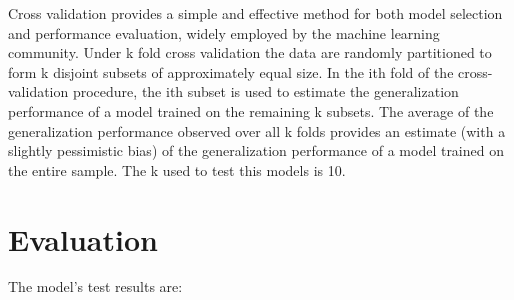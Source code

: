 Cross \textendash validation \cite{CrossValidatory} provides a simple and effective method for both model selection and performance evaluation, widely employed by the machine learning community. Under k \textendash fold cross \textendash validation the data are randomly partitioned to form k disjoint subsets of approximately equal size. In the ith fold of the cross-validation procedure, the ith subset is used to estimate the generalization performance of a model trained on the remaining k  subsets. The average of the generalization performance observed over all k folds provides an estimate (with a slightly pessimistic bias) of the generalization performance of a model trained on the entire sample.
The k used to test this models is 10.





\section{Evaluation} %
\label{sub:evaluation}
The model's test results are:

